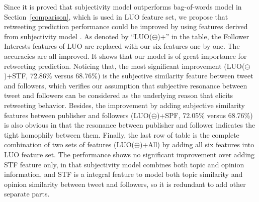 \documentclass[smallcondensed]{svjour3}     %
\begin{document}
Since it is proved that subjectivity model  outperforms bag-of-words model in Section~\ref{comparison}, which is used in LUO feature set, we propose that retweeting prediction performance could be improved by using features derived from subjectivity model . 
As denoted by ``LUO($ \ominus $)+'' in the table, the Follower Interests features of LUO are replaced with our six features one by one. 
The accuracies are all improved. It shows that our model is of great importance for retweeting prediction. 
Noticing that, the most significant improvement (LUO($ \ominus $)+STF, 72.86\% versus 68.76\%) is the subjective similarity feature between tweet and followers, which verifies our assumption that subjective resonance between tweet and followers can be considered as the underlying reason that elicits retweeting behavior.
Besides, the improvement by adding subjective similarity features between publisher and followers (LUO($ \ominus $)+SPF, 72.05\% versus 68.76\%) is also obvious in that the resonance between publisher and follower indicates the tight homophily between them.
Finally, the last row of table is the complete combination of two sets of features (LUO($ \ominus $)+All) by adding all six features into LUO feature set. 
The performance shows no significant improvement over adding STF feature only, in that subjectivity model  combines both topic and opinion information, and STF is a integral feature to model both topic similarity and opinion similarity between tweet and followers, so it is redundant to add other separate parts.
\end{document}
